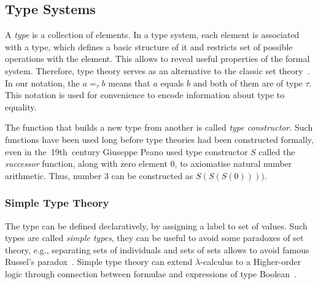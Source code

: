 \documentclass[article]{aaltoseries}
\begin{document}
\subsection{Type Systems}

A \textit{type} is a collection of elements. In a type system, each element is associated with a type, which defines a basic structure of it and restricts set of possible operations with the element. This allows to reveal useful properties of the formal system. Therefore, type theory serves as an alternative to the classic set theory~\cite{Tho91}.
In our notation, the $a =_{\tau} b$ means that $a$ equals $b$ and both of them are of type $\tau$. This notation is used for convenience to encode information about type to equality.

The function that builds a new type from another is called \textit{type constructor}. Such functions have been used long before type theories had been constructed formally, even in the~19th~century Giuseppe Peano used type constructor $S$ called the \textit{successor} function, along with zero element 0, to axiomatise natural number arithmetic. Thus, number 3 can be constructed as $S(S(S(0))))$.


\subsubsection{Simple Type Theory}
The type can be defined declaratively, by assigning a label to set of values. Such types are called \textit{simple types}, they can be useful to avoid some paradoxes of set theory, e.g., separating sets of individuals and sets of sets allows to avoid famous Russel's paradox~\cite{Irv95}. Simple type theory can extend $\lambda$-calculus to a Higher-order logic through connection between formulae and expressions of type Boolean~\cite{Paulson90}.



\end{document}

